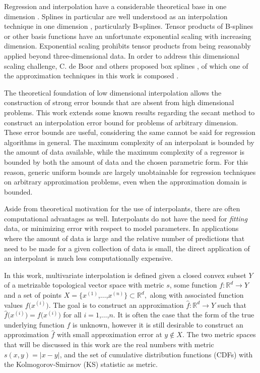 \documentclass[sigconf]{acmart}
\begin{document}
Regression and interpolation have a considerable theoretical base in one dimension \cite{cheney2009course}. Splines in particular are well understood as an interpolation technique in one dimension \cite{de1978practical}, particularly B-splines. Tensor products of B-splines \cite{unther1996interpolating} or other basis functions have an unfortunate exponential scaling with increasing dimension. Exponential scaling prohibits tensor products from being reasonably applied beyond three-dimensional data. In order to address this dimensional scaling challenge, C. de Boor and others proposed box splines \cite{de2013box}, of which one of the approximation techniques in this work is composed \cite{lux2018novel}.

The theoretical foundation of low dimensional interpolation allows the construction of strong error bounds that are absent from high dimensional problems. This work extends some known results regarding the secant method \cite{dennis1996numerical} to construct an interpolation error bound for problems of arbitrary dimension. These error bounds are useful, considering the same cannot be said for regression algorithms in general. The maximum complexity of an interpolant is bounded by the amount of data available, while the maximum complexity of a regressor is bounded by both the amount of data and the chosen parametric form. For this reason, generic uniform bounds are largely unobtainable for regression techniques on arbitrary approximation problems, even when the approximation domain is bounded.

Aside from theoretical motivation for the use of interpolants, there are often computational advantages as well. Interpolants do not have the need for \textit{fitting} data, or minimizing error with respect to model parameters. In applications where the amount of data is large and the relative number of predictions that need to be made for a given collection of data is small, the direct application of an interpolant is much less computationally expensive.

In this work, multivariate interpolation is defined given a closed convex subset $Y$ of a metrizable topological vector space with metric $s$, some function $f:\mathbb{R}^d \rightarrow Y$ and a set of points $X = \bigl\{x^{(1)}$,$\ldots$,$x^{(n)}\bigr\} \subset \mathbb{R}^d,$ along with associated function values $f\bigl(x^{(i)}\bigr)$. The goal is to construct an approximation $\hat f: \mathbb{R}^d \rightarrow Y$ such that $\hat f\bigl(x^{(i)}\bigr) = f\bigl(x^{(i)}\bigr)$ for all $i = 1$,$\ldots$,$n$. It is often the case that the form of the true underlying function $f$ is unknown, however it is still desirable to construct an approximation $\hat f$ with small approximation error at $y \notin X$. The two metric spaces that will be discussed in this work are the real numbers with metric $s(x,y) = |x-y|$, and the set of cumulative distribution functions (CDFs) with the Kolmogorov-Smirnov (KS) statistic as metric.
\end{document}
